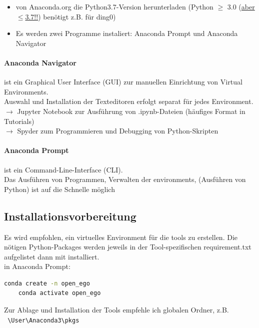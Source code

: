 \documentclass[
a4paper,     %
12pt         %
]{scrartcl}  %
\begin{document}
\begin{itemize}
	\item von Anaconda.org die Python3.7-Version herunterladen (Python $\geq$ 3.0 (\uline{aber $\leq$3.7!!}) benötigt z.B. für ding0)
	\item Es werden zwei Programme instaliert: Anaconda Prompt und Anaconda Navigator
\end{itemize}

\paragraph{Anaconda Navigator} ist ein Graphical User Interface (GUI) zur manuellen Einrichtung von Virtual Environments.\\
		 Auswahl und Installation der Texteditoren erfolgt separat für jedes Environment.\\
		 $\rightarrow$ Jupyter Notebook zur Ausführung von .ipynb-Dateien (häufiges Format in Tutorials)\\
		 $\rightarrow$ Spyder zum Programmieren und Debugging von Python-Skripten

\paragraph{Anaconda Prompt} ist ein Command-Line-Interface (CLI).\\
Das Ausführen von Programmen, Verwalten der environments, (Ausführen von Python) ist auf die Schnelle möglich

\subsection{Installationsvorbereitung}
Es wird empfohlen, ein virtuelles Environment für die tools zu erstellen. Die nötigen Python-Packages werden jeweils in der Tool-spezifischen requirement.txt aufgelistet dann mit installiert.
\\in Anaconda Prompt:
\begin{lstlisting}[language=bash]
	conda create -n open_ego
	conda activate open_ego
\end{lstlisting}

Zur Ablage und Installation der Tools empfehle ich globalen Ordner, z.B.\\
\noindent \hspace*{15mm} \texttt{ \textbackslash User\textbackslash Anaconda3\textbackslash pkgs}
\end{document}
